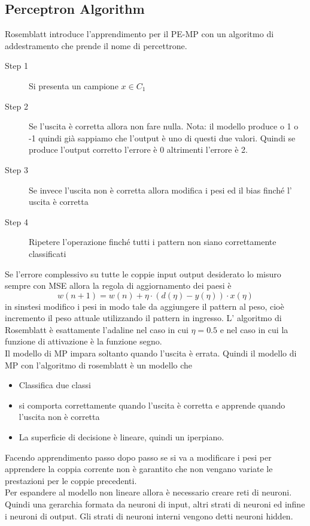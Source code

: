 \subsection{Perceptron Algorithm}
Rosemblatt introduce l'apprendimento per il PE-MP con un algoritmo di addestramento che prende il nome di percettrone. 
\begin{description}
\item[Step 1] Si presenta un campione $x \in C_1$
\item[Step 2] Se l'uscita è corretta allora non fare nulla. Nota: il modello produce o 1 o -1 quindi già sappiamo che l'output è uno di questi due valori. Quindi se produce l'output corretto l'errore è 0 altrimenti l'errore è 2.
\item[Step 3] Se invece l'uscita non è corretta allora modifica i pesi ed il bias finché l' uscita è corretta
\item[Step 4] Ripetere l’operazione finché tutti i pattern non siano correttamente classificati 
\end{description}
Se l'errore complessivo su tutte le coppie input output desiderato lo misuro sempre con MSE allora la regola di aggiornamento dei paesi è
\begin{equation}
w(n+1) = w(n)+\eta \cdot(d(\eta) - y(\eta)) \cdot x(\eta)
\end{equation}
in sinstesi modifico i pesi in modo tale da aggiungere il pattern al peso, cioè incremento il peso attuale utilizzando il pattern in ingresso. L' algoritmo di Rosemblatt è esattamente l'adaline nel caso in cui $\eta=0.5$ e nel caso in cui la funzione di attivazione è la funzione segno.\\
\noindent Il modello di MP impara soltanto quando l'uscita è errata. Quindi il modello di MP con l'algoritmo di rosemblatt è un modello che
\begin{itemize}
\item Classifica due classi
\item si comporta correttamente quando l'uscita è corretta e apprende quando l'uscita non è corretta
\item La superficie di decisione è lineare, quindi un iperpiano.
\end{itemize}
Facendo apprendimento passo dopo passo se si va a modificare i pesi per apprendere la coppia corrente non è garantito che non vengano variate le prestazioni per le coppie precedenti. \\

\noindent Per espandere al modello non lineare allora è necessario creare reti di neuroni. Quindi una gerarchia formata da neuroni di input, altri strati di neuroni ed infine i neuroni di output. Gli strati di neuroni interni vengono detti neuroni hidden.

